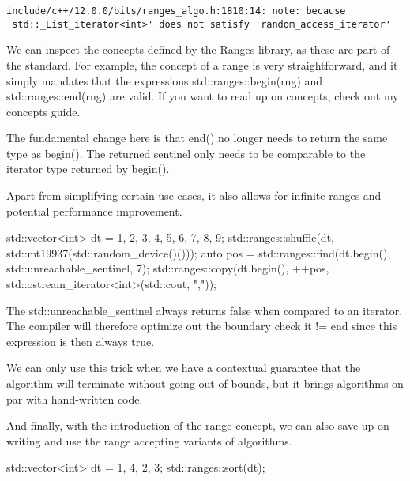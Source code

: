 \begin{verbatim}
include/c++/12.0.0/bits/ranges_algo.h:1810:14: note: because 'std::_List_iterator<int>' does not satisfy 'random_access_iterator'
\end{verbatim}

We can inspect the concepts defined by the Ranges library, as these are part of the standard. For example, the concept of a range is very straightforward, and it simply mandates that the expressions std::ranges::begin(rng) and std::ranges::end(rng) are valid. If you want to read up on concepts, check out my concepts guide.

The fundamental change here is that end() no longer needs to return the same type as begin(). The returned sentinel only needs to be comparable to the iterator type returned by begin().

Apart from simplifying certain use cases, it also allows for infinite ranges and potential performance improvement.

\begin{box-note}
\begin{cppcode}
std::vector<int> dt = { 1, 2, 3, 4, 5, 6, 7, 8, 9};
std::ranges::shuffle(dt, std::mt19937(std::random_device()()));
auto pos = std::ranges::find(dt.begin(), 
                             std::unreachable_sentinel,
                             7);
std::ranges::copy(dt.begin(), ++pos, 
                  std::ostream_iterator<int>(std::cout, ","));
\end{cppcode}
\end{box-note}

The std::unreachable\_sentinel always returns false when compared to an iterator. The compiler will therefore optimize out the boundary check it != end since this expression is then always true.

We can only use this trick when we have a contextual guarantee that the algorithm will terminate without going out of bounds, but it brings algorithms on par with hand-written code.

And finally, with the introduction of the range concept, we can also save up on writing and use the range accepting variants of algorithms.

\begin{box-note}
\begin{cppcode}
std::vector<int> dt = {1, 4, 2, 3};
std::ranges::sort(dt);
\end{cppcode}
\end{box-note}

